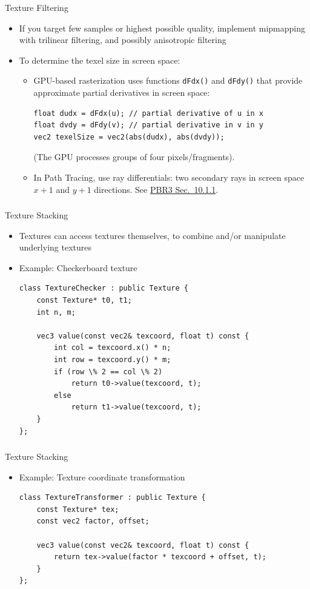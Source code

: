 \documentclass[utf8,stillsansserifmath,fleqn,t]{beamer}
\newcommand{\code}[1]{\texttt{#1}}
\begin{document}
\begin{frame}[fragile]
\frametitle{\insertsection}
Texture Filtering
\begin{itemize}
\item If you target few samples or highest possible quality, implement
mipmapping with trilinear filtering, and possibly anisotropic filtering
\item To determine the texel size in screen space:
    \begin{itemize}
    \item GPU-based rasterization uses functions \code{dFdx()} and \code{dFdy()} that provide
    approximate partial derivatives in screen space:
\begin{lstlisting}
float dudx = dFdx(u); // partial derivative of u in x
float dvdy = dFdy(v); // partial derivative in v in y
vec2 texelSize = vec2(abs(dudx), abs(dvdy));
\end{lstlisting}
    (The GPU processes groups of four pixels/fragments).
    \item In Path Tracing, use ray differentials: two secondary rays in screen
    space $x+1$ and $y+1$ directions.
    See
    \href{https://www.pbr-book.org/3ed-2018/Texture/Sampling_and_Antialiasing}{PBR3
    Sec.~10.1.1}.
    \end{itemize}
\end{itemize}
\end{frame}

\begin{frame}[fragile]
\frametitle{\insertsection}
Texture Stacking
\begin{itemize}
\item Textures can access textures themselves, to combine and/or manipulate
underlying textures
\item Example: Checkerboard texture
\begin{lstlisting}
class TextureChecker : public Texture {
    const Texture* t0, t1;
    int n, m;

    vec3 value(const vec2& texcoord, float t) const {
        int col = texcoord.x() * n;
        int row = texcoord.y() * m;
        if (row \% 2 == col \% 2)
            return t0->value(texcoord, t);
        else
            return t1->value(texcoord, t);
    }
};
\end{lstlisting}
\end{itemize}
\end{frame}

\begin{frame}[fragile]
\frametitle{\insertsection}
Texture Stacking
\begin{itemize}
\item Example: Texture coordinate transformation
\begin{lstlisting}
class TextureTransformer : public Texture {
    const Texture* tex;
    const vec2 factor, offset;

    vec3 value(const vec2& texcoord, float t) const {
        return tex->value(factor * texcoord + offset, t);
    }
};
\end{lstlisting}
\end{itemize}
\end{frame}
\end{document}
